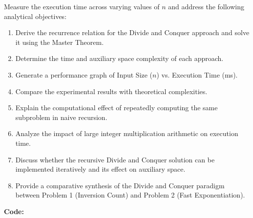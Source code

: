 \documentclass[12pt]{article}
\begin{document}
Measure the execution time across varying values of $n$ and address the following analytical objectives:
\begin{enumerate}
    \item Derive the recurrence relation for the Divide and Conquer approach and solve it using the Master Theorem.
    \item Determine the time and auxiliary space complexity of each approach.
    \item Generate a performance graph of Input Size ($n$) vs. Execution Time (ms).
    \item Compare the experimental results with theoretical complexities.
    \item Explain the computational effect of repeatedly computing the same subproblem in naive recursion.
    \item Analyze the impact of large integer multiplication arithmetic on execution time.
    \item Discuss whether the recursive Divide and Conquer solution can be implemented iteratively and its effect on auxiliary space.
    \item Provide a comparative synthesis of the Divide and Conquer paradigm between Problem 1 (Inversion Count) and Problem 2 (Fast Exponentiation).
\end{enumerate}

\vspace{0.3cm}

\textbf{Code:}
\end{document}
